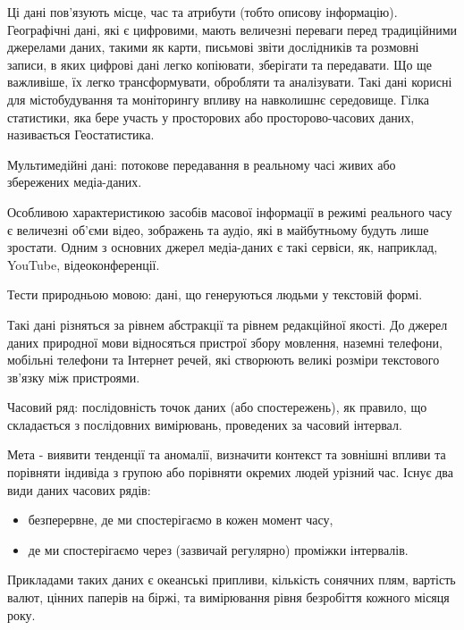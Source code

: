 Ці дані пов'язують місце, час та атрибути (тобто описову інформацію). Географічні дані, які є цифровими, мають величезні переваги перед традиційними джерелами даних, такими як карти, письмові звіти дослідників та розмовні записи, в яких цифрові дані легко копіювати, зберігати та передавати. Що ще важливіше, їх легко трансформувати, обробляти та аналізувати. Такі дані корисні для містобудування та моніторингу впливу на навколишнє середовище. Гілка статистики, яка бере участь у просторових або просторово-часових даних, називається Геостатистика.

\begin{ozn}
Мультимедійні дані: потокове передавання в реальному часі живих або збережених медіа-даних. 
\end{ozn}

Особливою характеристикою засобів масової інформації в режимі реального часу є величезні об'єми відео, зображень та аудіо, які в майбутньому будуть лише зростати. Одним з основних джерел медіа-даних є такі сервіси, як, наприклад, YouTube, відеоконференції.

\begin{ozn}
Тести природньою мовою: дані, що генеруються людьми у текстовій формі. 
\end{ozn}

Такі дані різняться за рівнем абстракції та рівнем редакційної якості. До джерел даних природної мови відносяться пристрої збору мовлення, наземні телефони, мобільні телефони та Інтернет речей, які створюють великі розміри текстового зв'язку між пристроями.

\begin{ozn}
Часовий ряд: послідовність точок даних (або спостережень), як правило, що складається з послідовних вимірювань, проведених за часовий інтервал. 
\end{ozn}

Мета - виявити тенденції та аномалії, визначити контекст та зовнішні впливи та порівняти індивіда з групою або порівняти окремих людей у ​​різний час. Існує два види даних часових рядів: 

\begin{itemize}
 \item безперервне, де ми спостерігаємо в кожен момент часу, 
 \item де ми спостерігаємо через (зазвичай регулярно) проміжки інтервалів. 
\end{itemize}

Прикладами таких даних є океанські припливи, кількість сонячних плям, вартість валют, цінних паперів на біржі, та вимірювання рівня безробіття кожного місяця року.

